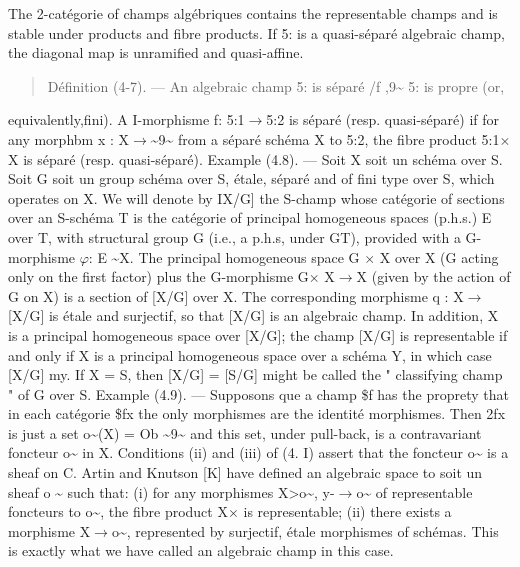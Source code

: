 \documentclass[11pt]{article}
\theoremstyle{plain}
\theoremstyle{definition}
\theoremstyle{remark}
\begin{document}
The 2-cat\'egorie of champs alg\'ebriques contains the representable champs and is stable under products and fibre products. If 5: is a quasi-s\'epar\'e algebraic champ, the diagonal map is unramified and quasi-affine.

\begin{quote}D\'efinition (4-7). --- An algebraic champ 5: is s\'epar\'e /f ,9\textasciitilde{} 5: is propre (or,\end{quote}
equivalently,fini). A I-morphisme f: 5:1$\to$5:2 is s\'epar\'e (resp. quasi-s\'epar\'e) if for any morphbm x : X$\to$\textasciitilde{}9\textasciitilde{} from a s\'epar\'e sch\'ema X to 5:2, the fibre product 5:1$\times$ X is s\'epar\'e (resp. quasi-s\'epar\'e). Example (4.8). --- Soit X soit un sch\'ema over S. Soit G soit un group sch\'ema over S, \'etale, s\'epar\'e and of fini type over S, which operates on X. We will denote by IX/G] the S-champ whose cat\'egorie of sections over an S-sch\'ema T is the cat\'egorie of principal homogeneous spaces (p.h.s.) E over T, with structural group G (i.e., a p.h.s, under GT), provided with a G-morphisme $\varphi$: E \textasciitilde{}X. The principal homogeneous space G $\times$ X over X (G acting only on the first factor) plus the G-morphisme G$\times$ X$\to$X (given by the action of G on X) is a section of [X/G] over X. The corresponding morphisme q : X$\to$ [X/G] is \'etale and surjectif, so that [X/G] is an algebraic champ. In addition, X is a principal homogeneous space over [X/G]; the champ [X/G] is representable if and only if X is a principal homogeneous space over a sch\'ema Y, in which case [X/G] my. If X = S, then [X/G] = [S/G] might be called the " classifying champ " of G over S. Example (4.9). --- Supposons que a champ \$f has the proprety that in each cat\'egorie \$fx the only morphismes are the identit\'e morphismes. Then 2fx is just a set o\textasciitilde{}(X) = Ob \textasciitilde{}9\textasciitilde{} and this set, under pull-back, is a contravariant foncteur o\textasciitilde{} in X. Conditions (ii) and (iii) of (4. I) assert that the foncteur o\textasciitilde{} is a sheaf on C. Artin and Knutson [K] have defined an algebraic space to soit un sheaf o \textasciitilde{} such that: (i) for any morphismes X>o\textasciitilde{}, y-$\to$o\textasciitilde{} of representable foncteurs to o\textasciitilde{}, the fibre product X$\times$ is representable; (ii) there exists a morphisme X$\to$o\textasciitilde{}, represented by surjectif, \'etale morphismes of sch\'emas. This is exactly what we have called an algebraic champ in this case.
\end{document}
